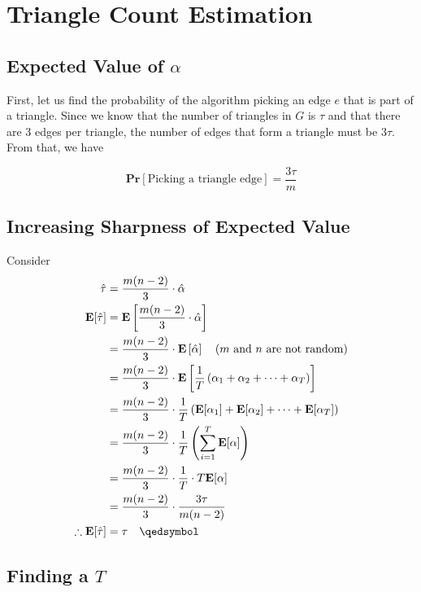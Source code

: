 \section{Triangle Count Estimation}

\subsection{Expected Value of $\alpha$}

First, let us find the probability of the algorithm picking an edge $e$ that is part of a triangle. Since we know that the number of triangles in $G$ is $\tau$ and that there are 3 edges per triangle, the number of edges that form a triangle must be $3\tau$. From that, we have

\[ \mathbf{Pr}\left[\text{Picking a triangle edge}\right] = \frac{3\tau}{m} \]

\subsection{Increasing Sharpness of Expected Value}

Consider
\begin{equation*}
\begin{aligned}
  \hat{\tau}
    &= \frac{m(n-2)}{3}\cdot\hat{\alpha} \\
  \mathbf{E}[\hat{\tau}]
    &= \mathbf{E}\left[\frac{m(n-2)}{3}\cdot\hat{\alpha}\right] \\
    &= \frac{m(n-2)}{3}\cdot\mathbf{E}\left[\hat{\alpha}\right] \quad \text{($m$ and $n$ are not random)} \\
    &= \frac{m(n-2)}{3}\cdot\mathbf{E}\left[\frac{1}{T}\left(\alpha_1 + \alpha_2 + \cdots + \alpha_T\right)\right] \\
    &= \frac{m(n-2)}{3}\cdot\frac{1}{T}\left(\mathbf{E}[\alpha_1] + \mathbf{E}[\alpha_2] + \cdots + \mathbf{E}[\alpha_T]\right) \\
    &= \frac{m(n-2)}{3}\cdot\frac{1}{T}\left(\sum_{i=1}^T \mathbf{E}[\alpha]\right) \\
    &= \frac{m(n-2)}{3}\cdot\frac{1}{T}\cdot T\mathbf{E}[\alpha] \\
    &= \frac{m(n-2)}{3}\cdot\frac{3\tau}{m(n-2)} \\
  \therefore \mathbf{E}[\hat{\tau}]
    &= \tau \quad \qedsymbol
\end{aligned}
\end{equation*}

\subsection{Finding a $T$}

